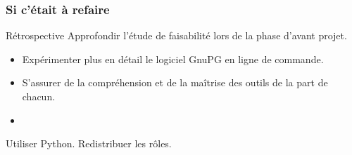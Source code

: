   \begin{frame}
  \frametitle{\color{white}Si c'était à refaire}
    \begin{block}{Rétrospective}
    Approfondir l'étude de faisabilité lors de la phase d'avant projet.
      \begin{itemize}
        \item Expérimenter plus en détail le logiciel GnuPG en ligne de commande.
        \item S'assurer de la compréhension et de la maîtrise des outils de la part de chacun.
        \item 
      \end{itemize}
    Utiliser Python.
    Redistribuer les rôles.
    \end{block}


  \end{frame}
